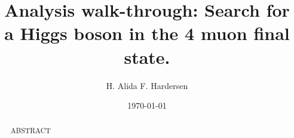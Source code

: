 \documentclass[10pt, aps, twocolumn, a4paper, nofootinbib]{revtex4}
\begin{document}
\title{Analysis walk-through: Search for a Higgs boson in the 4 muon final state.}
\author{H. Alida F. Hardersen}
\date{\today}

\begin{abstract}
    \centering 
ABSTRACT
\end{abstract}
\maketitle

\newpage

\end{document}
